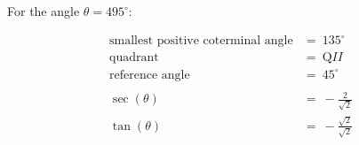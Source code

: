 For the angle $\theta = 495^{\circ}$:

$$
\begin{align*}
  \text{smallest positive coterminal angle} &=\ 135^{\circ} \\
  \text{quadrant} &=\ \text{Q}II \\
  \text{reference angle} &=\ 45^{\circ} \\
  \\
  \sec(\theta) &=\ -\frac{2}{\sqrt{2}} \\
  \tan(\theta) &=\ -\frac{\sqrt{2}}{\sqrt{2}}
\end{align*}
$$
